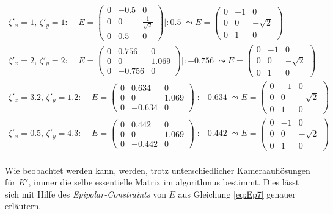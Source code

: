 \begin{gather*}
	\zeta'_x = 1, \, \zeta'_y = 1: \; \; \;\;
	E = \begin{pmatrix}
		0&-0.5&0\\
		0&0&\frac{1}{\sqrt{2}}\\
		0&0.5&0
	\end{pmatrix} |: 0.5 \; \leadsto
	E = \begin{pmatrix}
		0&-1&0\\
		0&0&-\sqrt{2}\\
		0&1&0
	\end{pmatrix}\\
	\zeta'_x = 2, \, \zeta'_y = 2: \; \; \;\;
	E = \begin{pmatrix}
		0&0.756&0\\
		0&0&1.069\\
		0&-0.756&0
	\end{pmatrix} |: -0.756 \; \leadsto
	E = \begin{pmatrix}
		0&-1&0\\
		0&0&-\sqrt{2}\\
		0&1&0
	\end{pmatrix}\\
	\zeta'_x = 3.2, \, \zeta'_y = 1.2: \; \; \;\;
	E = \begin{pmatrix}
		0&0.634&0\\
		0&0&1.069\\
		0&-0.634&0
	\end{pmatrix} |: -0.634 \; \leadsto
	E = \begin{pmatrix}
		0&-1&0\\
		0&0&-\sqrt{2}\\
		0&1&0
	\end{pmatrix}\\
	\zeta'_x = 0.5, \, \zeta'_y = 4.3: \; \; \;\;
	E = \begin{pmatrix}
		0&0.442&0\\
		0&0&1.069\\
		0&-0.442&0
	\end{pmatrix} |: -0.442 \; \leadsto
	E = \begin{pmatrix}
		0&-1&0\\
		0&0&-\sqrt{2}\\
		0&1&0
	\end{pmatrix}\\
\end{gather*}

Wie beobachtet werden kann, werden, trotz unterschiedlicher Kameraauflösungen für $K'$, immer die selbe essentielle Matrix im algorithmus bestimmt. Dies lässt sich mit Hilfe des \textit{Epipolar-Constraints} von $E$ aus Gleichung \ref{eq:Ep7} genauer erläutern.\\


